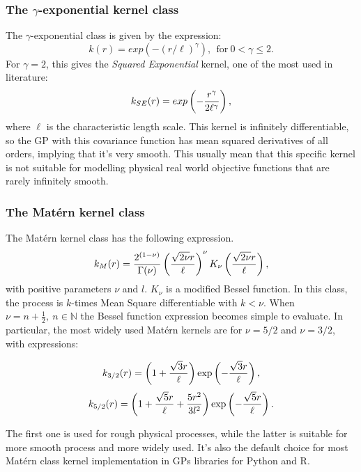 \documentclass{article}
\begin{document}
	\subsubsection{The $\gamma$-exponential kernel class}
	The $\gamma$-exponential class is given by the expression:
	\begin{equation}
		k(r) = exp(-(r/\ell)^\gamma), \ \ \text{for} \ 0 < \gamma \leq 2.
	\end{equation}
	For $\gamma = 2$, this gives the \textit{Squared Exponential} kernel, one of the most used in literature:
	\begin{equation}
		k_{SE}(r) = exp\left(-{r^\gamma \over 2 \ell^\gamma}\right),
	\end{equation}
	where $\ell$ is the characteristic length scale. This kernel is infinitely differentiable, so the GP with this covariance function has mean squared derivatives of all orders, implying that it's very smooth. This usually mean that this specific kernel is not suitable for modelling physical real world objective functions that are rarely infinitely smooth.
	
	\subsubsection{The Matérn kernel class}
	The Matérn kernel class has the following expression.
	\begin{equation}
		k_M(r) = {2^{(1 - \nu)} \over \Gamma (\nu)} \left( {\sqrt{2 \nu} r \over \ell} \right)^\nu K_\nu \left( {\sqrt{2 \nu} r \over \ell} \right),
	\end{equation}
	with positive parameters $\nu$ and $l$. $K_\nu$ is a modified Bessel function. In this class, the process is $k$-times Mean Square differentiable with $k < \nu$.
	When $\nu = n + \frac{1}{2}, \ n \in \mathbb{N}$ the Bessel function expression becomes simple to evaluate. In particular, the most widely used Matérn kernels are for $\nu = 5/2$ and $\nu = 3/2$, with expressions:
	
	\begin{equation}
		k_{3/2}(r) = \left(1 + {\sqrt{3}r \over \ell} \right) \exp \left( - {\sqrt{3}r \over \ell} \right),
	\end{equation}
	\begin{equation}
		k_{5/2}(r) = \left(1 + {\sqrt{5}r \over \ell} + {5 r^2 \over 3l^2} \right) \exp \left( - {\sqrt{5}r \over \ell} \right).
	\end{equation}
	
	The first one is used for rough physical processes, while the latter is suitable for more smooth process and more widely used. It's also the default choice for most Matérn class kernel implementation in GPs libraries for Python and R.
	
\end{document}
